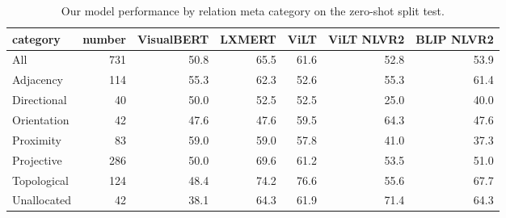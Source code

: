 \begin{table}[ht]
\centering
\begin{adjustbox}{max width=0.7\textwidth}
\begin{tabular}{lrrrrrr}
\toprule
category &  number &  VisualBERT &  LXMERT &  ViLT &  ViLT NLVR2 &  BLIP NLVR2 \\
\midrule
All         &     731 &        50.8 &    65.5 &  61.6 &        52.8 &        53.9 \\
\midrule
Adjacency   &     114 &        55.3 &    62.3 &  52.6 &        55.3 &        61.4 \\
Directional &      40 &        50.0 &    52.5 &  52.5 &        25.0 &        40.0 \\
Orientation &      42 &        47.6 &    47.6 &  59.5 &        64.3 &        47.6 \\
Proximity   &      83 &        59.0 &    59.0 &  57.8 &        41.0 &        37.3 \\
Projective  &     286 &        50.0 &    69.6 &  61.2 &        53.5 &        51.0 \\
Topological &     124 &        48.4 &    74.2 &  76.6 &        55.6 &        67.7 \\
Unallocated &      42 &        38.1 &    64.3 &  61.9 &        71.4 &        64.3 \\
\bottomrule
\end{tabular}
\end{adjustbox}
\caption{Our model performance by relation meta category on the zero-shot split test.}
\label{tab:results-by-relation-meta-category-zeroshot}
\end{table}
